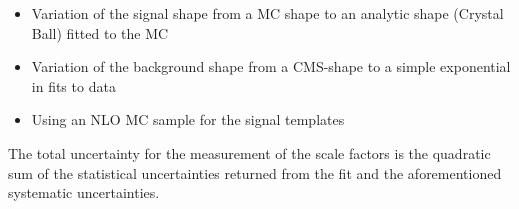 \begin{itemize}
   \item Variation of the signal shape from a MC shape to an analytic shape (Crystal Ball) fitted to the MC
   \item Variation of the background shape from a CMS-shape to a simple exponential in fits to data
   \item Using an NLO MC sample for the signal templates
\end{itemize}

The total uncertainty for the measurement of the scale factors is the quadratic sum of the statistical uncertainties returned from the fit and the aforementioned systematic uncertainties.



